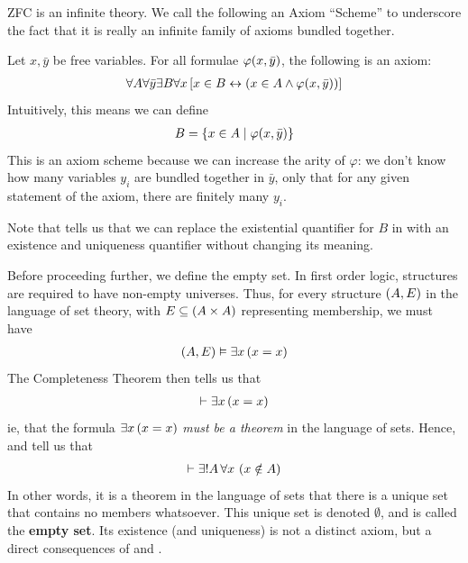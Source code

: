 ZFC is an infinite theory. We call the following an Axiom ``Scheme'' to underscore the fact that it is really an infinite family of axioms bundled together.

\begin{baxiom}\label{ZFC:Compr}
    Let $x, \bar{y}$ be free variables. For all formulae $\varphi\!\left( x, \bar{y} \right)$, the following is an axiom:
    \begin{align*}
        \forall A \forall \bar{y} \exists B \forall x \left[ x \in B \leftrightarrow \left( x \in A \land \varphi\!\left( x, \bar{y} \right) \right) \right]
    \end{align*}
    Intuitively, this means we can define
    \begin{align*}
        B = \left\{ x \in A \; \middle\vert \; \varphi\!\left( x, \bar{y} \right) \right\}
    \end{align*}
    This is an axiom scheme because we can increase the arity of $\varphi$: we don't know how many variables $y_i$ are bundled together in $\bar{y}$, only that for any given statement of the axiom, there are finitely many $y_i$.
\end{baxiom}

Note that  tells us that we can replace the existential quantifier for $B$ in  with an existence and uniqueness quantifier without changing its meaning.

Before proceeding further, we define the empty set. In first order logic, structures are required to have non-empty universes. Thus, for every structure $\left( A, E \right)$ in the language of set theory, with $E \subseteq \left( A \times A \right)$ representing membership, we must have
\begin{align*}
    \left( A, E \right) \vDash \exists x \left( x = x \right)
\end{align*}
The Completeness Theorem then tells us that
\begin{align*}
    \vdash \exists x \left( x = x \right)
\end{align*}
ie, that the formula $\exists x \left( x = x \right)$ \textit{must be a theorem} in the language of sets. Hence,  and  tell us that
\begin{align*}
    \vdash \exists! A \, \forall x \, \left( x \notin A \right)
\end{align*}
In other words, it is a theorem in the language of sets that there is a unique set that contains no members whatsoever. This unique set is denoted $\emptyset$, and is called the \textbf{empty set}. Its existence (and uniqueness) is not a distinct axiom, but a direct consequences of  and .

